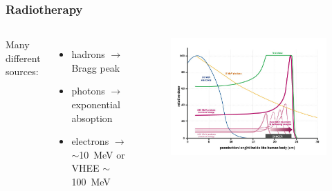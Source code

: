     \begin{frame}[noframenumbering]
        \frametitle{Radiotherapy}
        \begin{columns}
            Many different sources: 
            \begin{itemize}
                \item hadrons $\rightarrow$ Bragg peak 
                \item photons $\rightarrow$ exponential absoption
                \item electrons $\rightarrow$ $\sim$\SI{10}{MeV} or VHEE $\sim$\SI{100}{MeV}
            \end{itemize}
                \begin{figure}[h!]
                    \centering
                    \includegraphics[width=1.\linewidth]{figures/pixel_detectors_usage/Bragg-Peak.png}
                \end{figure}
        \end{columns}
    \end{frame} 

